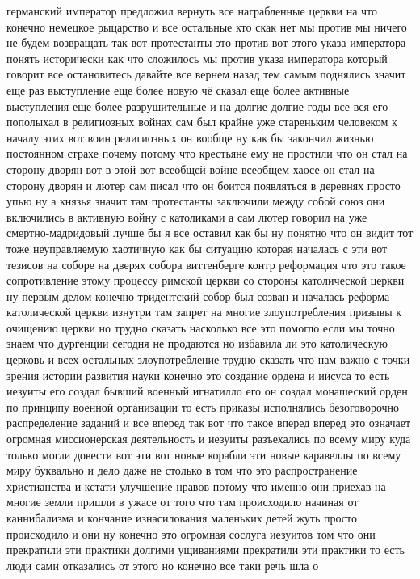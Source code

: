 германский император предложил вернуть все награбленные церкви на что конечно
немецкое рыцарство и все остальные кто скак нет мы против мы ничего не будем
возвращать так вот протестанты это против вот этого указа императора понять
исторически как что сложилось мы против указа императора который говорит все
остановитесь давайте все вернем назад тем самым поднялись значит еще раз
выступление еще более новую чё сказал еще более активные выступления еще более
разрушительные и на долгие долгие годы все вся его пополыхал в религиозных
войнах сам был крайне уже стареньким человеком к началу этих вот воин
религиозных он вообще ну как бы закончил жизнью постоянном страхе почему потому
что крестьяне ему не простили что он стал на сторону дворян вот в этой вот
всеобщей войне всеобщем хаосе он стал на сторону дворян и лютер сам писал что он
боится появляться в деревнях просто упью ну а князья значит там протестанты
заключили между собой союз они включились в активную войну с католиками а сам
лютер говорил на уже смертно-мадридовый лучше бы я все оставил как бы ну понятно
что он видит тот тоже неуправляемую хаотичную как бы ситуацию которая началась с
эти вот тезисов на соборе на дверях собора виттенберге контр реформация что это
такое сопротивление этому процессу римской церкви со стороны католической церкви
ну первым делом конечно тридентский собор был созван и началась реформа
католической церкви изнутри там запрет на многие злоупотребления призывы к
очищению церкви но трудно сказать насколько все это помогло если мы точно знаем
что дургенции сегодня не продаются но избавила ли это католическую церковь и
всех остальных злоупотребление трудно сказать что нам важно с точки зрения
истории развития науки конечно это создание ордена и иисуса то есть иезуиты его
создал бывший военный игнатилло его он создал монашеский орден по принципу
военной организации то есть приказы исполнялись безоговорочно распределение
заданий и все вперед так вот что такое вперед вперед это означает огромная
миссионерская деятельность и иезуиты разъехались по всему миру куда только могли
довести вот эти вот новые корабли эти новые каравеллы по всему миру буквально и
дело даже не столько в том что это распространение христианства и кстати
улучшение нравов потому что именно они приехав на многие земли пришли в ужасе от
того что там происходило начиная от каннибализма и кончание изнасилования
маленьких детей жуть просто происходило и они ну конечно это огромная сослуга
иезуитов том что они прекратили эти практики долгими ущиваниями прекратили эти
практики то есть люди сами отказались от этого но конечно все таки речь шла о
